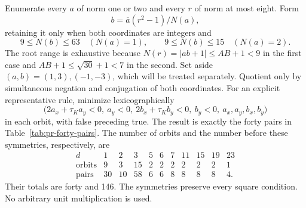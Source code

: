 \documentclass[12pt]{article}
\numberwithin{equation}{section}
\begin{document}
Enumerate every \(a\) of norm one or two and every \(r\) of norm at
most eight. Form
\[
 b=\overline a(r^2-1)/N(a),
\]
retaining it only when both coordinates are integers and
\[
 9\le N(b)\le63\quad(N(a)=1),\qquad
 9\le N(b)\le15\quad(N(a)=2).
\]
The root range is exhaustive because $N(r)=|ab+1|\le AB+1<9$ in the first case and $AB+1\le\sqrt{30}+1<7$ in the second.
Set aside $(a,b)=(1,3),(-1,-3)$, which will be treated separately. Quotient only by simultaneous
negation and conjugation of both coordinates. For an explicit
representative rule, minimize lexicographically
\[
 \bigl(2a_x+\tau_Ka_y<0,\ a_y<0,\ 2b_x+\tau_Kb_y<0,\ b_y<0,\ a_x,a_y,b_x,b_y\bigr)
\]
in each orbit, with false preceding true. The result is exactly the
forty pairs in Table~\ref{tab:pr-forty-pairs}. The number of orbits
and the number before these symmetries, respectively, are
\[
\begin{array}{c|rrrrrrrrrr}
 d&1&2&3&5&6&7&11&15&19&23\\\hline
 \text{orbits}&9&3&15&2&2&2&2&2&2&1\\
 \text{pairs}&30&10&58&6&6&8&8&8&8&4.
\end{array}
\]
Their totals are forty and 146. The symmetries preserve every square
condition. No arbitrary unit multiplication is used.
\end{document}
